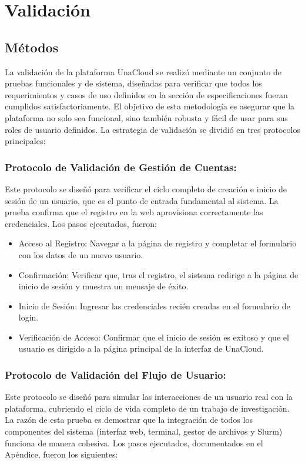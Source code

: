 \section{Validación}

\subsection{Métodos}
La validación de la plataforma UnaCloud se realizó mediante un conjunto de pruebas funcionales y de sistema, diseñadas para verificar que todos los requerimientos y casos de uso definidos en la sección de especificaciones fueran cumplidos satisfactoriamente. El objetivo de esta metodología es asegurar que la plataforma no solo sea funcional, sino también robusta y fácil de usar para sus roles de usuario definidos. La estrategia de validación se dividió en tres protocolos principales:

\subsubsection{Protocolo de Validación de Gestión de Cuentas:}
Este protocolo se diseñó para verificar el ciclo completo de creación e inicio de sesión de un usuario, que es el punto de entrada fundamental al sistema. La prueba confirma que el registro en la web aprovisiona correctamente las credenciales. Los pasos ejecutados, fueron:

\begin{itemize}
    \item Acceso al Registro: Navegar a la página de registro y completar el formulario con los datos de un nuevo usuario.
    \item Confirmación: Verificar que, tras el registro, el sistema redirige a la página de inicio de sesión y muestra un mensaje de éxito.
    \item Inicio de Sesión: Ingresar las credenciales recién creadas en el formulario de login.
    \item Verificación de Acceso: Confirmar que el inicio de sesión es exitoso y que el usuario es dirigido a la página principal de la interfaz de UnaCloud.
\end{itemize}

\subsubsection{Protocolo de Validación del Flujo de Usuario:}

Este protocolo se diseñó para simular las interacciones de un usuario real con la plataforma, cubriendo el ciclo de vida completo de un trabajo de investigación. La razón de esta prueba es demostrar que la integración de todos los componentes del sistema (interfaz web, terminal, gestor de archivos y Slurm) funciona de manera cohesiva. Los pasos ejecutados, documentados en el Apéndice, fueron los siguientes:

